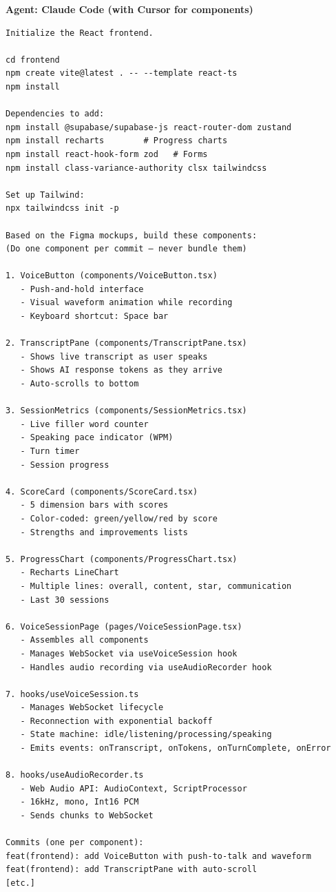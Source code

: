 \documentclass[
  11pt,
]{article}
\begin{document}
\textbf{Agent: Claude Code (with Cursor for components)}

\begin{lstlisting}
Initialize the React frontend.

cd frontend
npm create vite@latest . -- --template react-ts
npm install

Dependencies to add:
npm install @supabase/supabase-js react-router-dom zustand
npm install recharts        # Progress charts
npm install react-hook-form zod   # Forms
npm install class-variance-authority clsx tailwindcss

Set up Tailwind:
npx tailwindcss init -p

Based on the Figma mockups, build these components:
(Do one component per commit — never bundle them)

1. VoiceButton (components/VoiceButton.tsx)
   - Push-and-hold interface
   - Visual waveform animation while recording
   - Keyboard shortcut: Space bar

2. TranscriptPane (components/TranscriptPane.tsx)
   - Shows live transcript as user speaks
   - Shows AI response tokens as they arrive
   - Auto-scrolls to bottom

3. SessionMetrics (components/SessionMetrics.tsx)
   - Live filler word counter
   - Speaking pace indicator (WPM)
   - Turn timer
   - Session progress

4. ScoreCard (components/ScoreCard.tsx)
   - 5 dimension bars with scores
   - Color-coded: green/yellow/red by score
   - Strengths and improvements lists

5. ProgressChart (components/ProgressChart.tsx)
   - Recharts LineChart
   - Multiple lines: overall, content, star, communication
   - Last 30 sessions

6. VoiceSessionPage (pages/VoiceSessionPage.tsx)
   - Assembles all components
   - Manages WebSocket via useVoiceSession hook
   - Handles audio recording via useAudioRecorder hook

7. hooks/useVoiceSession.ts
   - Manages WebSocket lifecycle
   - Reconnection with exponential backoff
   - State machine: idle/listening/processing/speaking
   - Emits events: onTranscript, onTokens, onTurnComplete, onError

8. hooks/useAudioRecorder.ts
   - Web Audio API: AudioContext, ScriptProcessor
   - 16kHz, mono, Int16 PCM
   - Sends chunks to WebSocket

Commits (one per component):
feat(frontend): add VoiceButton with push-to-talk and waveform
feat(frontend): add TranscriptPane with auto-scroll
[etc.]
\end{lstlisting}
\end{document}
